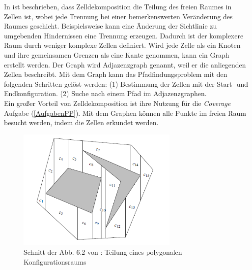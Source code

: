 In \cite{Principles:05} ist beschrieben, dass Zelldekomposition die Teilung des freien Raumes in Zellen ist, wobei jede Trennung bei einer bemerkenswerten Veränderung des Raumes geschieht. Beispielsweise kann eine Änderung der Sichtlinie zu umgebenden Hindernissen eine Trennung erzeugen. Dadurch ist der komplexere Raum durch weniger komplexe Zellen definiert. Wird jede Zelle als ein Knoten und ihre gemeinsamen Grenzen als eine Kante genommen, kann ein Graph erstellt werden. Der Graph wird Adjazenzgraph genannt, weil er die anliegenden Zellen beschreibt. 
Mit dem Graph kann das Pfadfindungsproblem mit den folgenden Schritten gelöst werden: (1) Bestimmung der Zellen mit der Start- und Endkonfiguration. (2) Suche nach einem Pfad im Adjazenzgraphen.\\
Ein großer Vorteil von Zelldekomposition ist ihre Nutzung für die \textit{Coverage} Aufgabe (\ref{AufgabenPP}). Mit dem Graphen können alle Punkte im freien Raum besucht werden, indem die Zellen erkundet werden.

\begin{figure}[H] %
	\centering
	\includegraphics[width=0.7\textwidth]{images/Cell_Dekomposition.png}
	\caption{Schnitt der Abb. 6.2 von \cite{Principles:05}: Teilung eines polygonalen Konfigurationsraums}
	\label{potentialfield02}
\end{figure}

